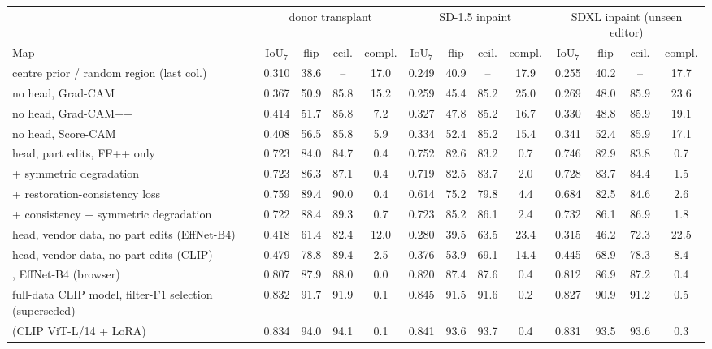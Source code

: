 \begin{tabular}{l cccc cccc cccc}
\toprule
 & \multicolumn{4}{c}{donor transplant} & \multicolumn{4}{c}{SD-1.5 inpaint} & \multicolumn{4}{c}{SDXL inpaint (unseen editor)} \\
\cmidrule(lr){2-5}\cmidrule(lr){6-9}\cmidrule(lr){10-13}
Map & IoU$_7$ & flip & ceil. & compl. & IoU$_7$ & flip & ceil. & compl. & IoU$_7$ & flip & ceil. & compl. \\
\midrule
centre prior / random region (last col.) & 0.310 & 38.6 & -- & 17.0 & 0.249 & 40.9 & -- & 17.9 & 0.255 & 40.2 & -- & 17.7 \\
\midrule
no head, Grad-CAM~\cite{gradcam} & 0.367 & 50.9 & 85.8 & 15.2 & 0.259 & 45.4 & 85.2 & 25.0 & 0.269 & 48.0 & 85.9 & 23.6 \\
no head, Grad-CAM++~\cite{gradcampp} & 0.414 & 51.7 & 85.8 & 7.2 & 0.327 & 47.8 & 85.2 & 16.7 & 0.330 & 48.8 & 85.9 & 19.1 \\
no head, Score-CAM~\cite{scorecam} & 0.408 & 56.5 & 85.8 & 5.9 & 0.334 & 52.4 & 85.2 & 15.4 & 0.341 & 52.4 & 85.9 & 17.1 \\
head, part edits, FF++ only & 0.723 & 84.0 & 84.7 & 0.4 & 0.752 & 82.6 & 83.2 & 0.7 & 0.746 & 82.9 & 83.8 & 0.7 \\
+ symmetric degradation & 0.723 & 86.3 & 87.1 & 0.4 & 0.719 & 82.5 & 83.7 & 2.0 & 0.728 & 83.7 & 84.4 & 1.5 \\
+ restoration-consistency loss & 0.759 & 89.4 & 90.0 & 0.4 & 0.614 & 75.2 & 79.8 & 4.4 & 0.684 & 82.5 & 84.6 & 2.6 \\
+ consistency + symmetric degradation & 0.722 & 88.4 & 89.3 & 0.7 & 0.723 & 85.2 & 86.1 & 2.4 & 0.732 & 86.1 & 86.9 & 1.8 \\
head, vendor data, no part edits (EffNet-B4) & 0.418 & 61.4 & 82.4 & 12.0 & 0.280 & 39.5 & 63.5 & 23.4 & 0.315 & 46.2 & 72.3 & 22.5 \\
head, vendor data, no part edits (CLIP) & 0.479 & 78.8 & 89.4 & 2.5 & 0.376 & 53.9 & 69.1 & 14.4 & 0.445 & 68.9 & 78.3 & 8.4 \\
\oursF{}, EffNet-B4 (browser) & 0.807 & 87.9 & 88.0 & 0.0 & 0.820 & 87.4 & 87.6 & 0.4 & 0.812 & 86.9 & 87.2 & 0.4 \\
full-data CLIP model, filter-F1 selection (superseded) & 0.832 & 91.7 & 91.9 & 0.1 & 0.845 & 91.5 & 91.6 & 0.2 & 0.827 & 90.9 & 91.2 & 0.5 \\
\oursF{} (CLIP ViT-L/14 + LoRA) & 0.834 & 94.0 & 94.1 & 0.1 & 0.841 & 93.6 & 93.7 & 0.4 & 0.831 & 93.5 & 93.6 & 0.3 \\
\bottomrule
\end{tabular}
